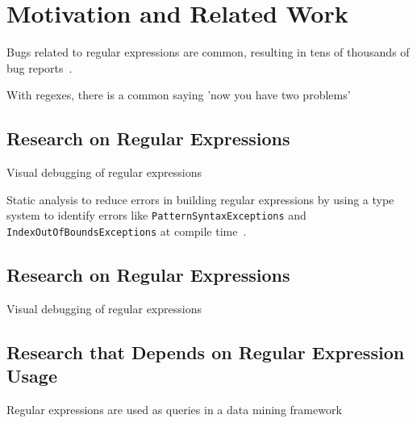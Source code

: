 \section{Motivation and Related Work}
\label{sec:motivation}
Bugs related to regular expressions are common, resulting in tens of thousands of bug reports~\cite{Spishak:2012:TSR:2318202.2318207}.

With regexes, there is a common saying 'now you have two problems'



\subsection{Research on Regular Expressions}
Visual debugging of regular expressions~\cite{Beck:2014:RVD:2591062.2591111}

Static analysis to reduce errors in building regular expressions by using a type system to identify errors like {\tt PatternSyntaxExceptions} and {\tt IndexOutOfBoundsExceptions} at compile time~\cite{Spishak:2012:TSR:2318202.2318207}. 

\subsection{Research on Regular Expressions}
Visual debugging of regular expressions~\cite{Beck:2014:RVD:2591062.2591111}

\subsection{Research that Depends on Regular Expression Usage}
Regular expressions are used as queries in a data mining framework~\cite{Begel:2010:CDE:1806799.1806821}

